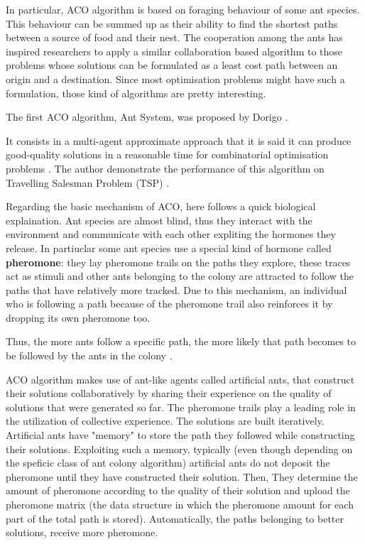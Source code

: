 In particular, ACO algorithm  is based on  foraging  behaviour  of  some  ant species.  
This behaviour  can  be  summed up as  their  ability  to  find  the  shortest  paths between  a source of food  and  their  nest.
The cooperation  among  the  ants  has inspired researchers to apply a similar collaboration based algorithm to those problems whose   solutions   can   be formulated as a least cost path between an origin and a destination.
Since most optimisation problems  might have such a formulation,  those kind of algorithms are  pretty interesting.

The first ACO algorithm, Ant System, was proposed by Dorigo \cite{cinque, sei, sette, otto, nove}.

It consists in a multi-agent approximate approach that it is said it can produce good-quality solutions in a reasonable time for combinatorial optimisation problems \cite{cinque}. 
The author demonstrate the performance of this algorithm on Travelling Salesman  Problem  (TSP) \cite{sei}. 

Regarding the basic mechanism of ACO, here follows a quick biological explaination.
Ant species are almost blind, thus they interact with the environment and communicate with each  other  expliting the hormones  they  release.  
In partiuclar some  ant  species use a special kind of hormone called \textbf{pheromone}: they lay pheromone trails on the paths they explore, these traces act as stimuli and other ants belonging to the colony are attracted to follow  the  paths  that  have  relatively  more  tracked.  
Due to this mechanism, an individual who is following a  path  because of the  pheromone  trail  also reinforces  it  by  dropping its  own pheromone  too.  

Thus, the  more ants  follow  a  specific  path,  the  more  likely  that  path  becomes  to  be  followed  by  the  ants  in the colony \cite{ cinque,otto, nove}.  

ACO  algorithm  makes use  of ant-like  agents  called artificial ants, that construct their   solutions   collaboratively   by   sharing   their experience on the quality of solutions that were generated so far.
The pheromone trails play  a  leading  role  in  the  utilization  of collective experience.
The solutions are built iteratively.
Artificial  ants  have  "memory"  to  store  the  path  they  followed  while  constructing  their solutions.  Exploiting such a memory,  typically (even though depending on the speficic class of ant colony algorithm) artificial  ants  do not deposit  the pheromone until they have constructed their solution. Then, They determine the amount of pheromone according  to  the  quality  of  their  solution  and upload the pheromone matrix (the data structure in which the pheromone amount for each part of the total path is stored). 
Automatically, the  paths  belonging  to  better  solutions,  receive  more pheromone.

